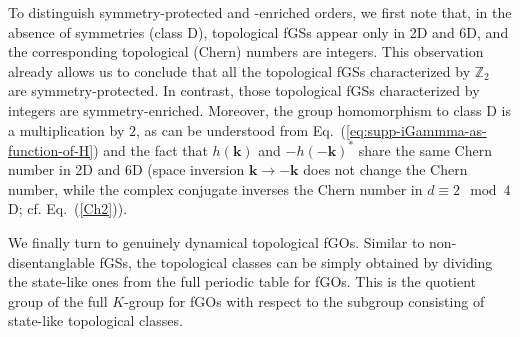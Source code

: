 \documentclass[prl,twocolumn,preprintnumbers,superscriptaddress,amsmath,amssymb]{revtex4-1}
\begin{document}
To distinguish symmetry-protected and -enriched orders, we first note that, in the absence of symmetries (class D), topological fGSs appear only in 2D and 6D, and the corresponding topological (Chern) numbers are integers. This observation already allows us to conclude that all the topological fGSs characterized by $\mathbb{Z}_2$ are symmetry-protected. In contrast, those topological fGSs characterized by integers are symmetry-enriched. Moreover, the group homomorphism to class D is a multiplication by $2$, as can be understood from Eq.~(\ref{eq:supp-iGammma-as-function-of-H}) and the fact that $h(\boldsymbol{k})$ and $-h(-\boldsymbol{k})^*$ share the same Chern number in 2D and 6D (space inversion $\boldsymbol{k}\to -\boldsymbol{k}$ does not change the Chern number, while the complex conjugate inverses the Chern number in $d\equiv 2\mod 4$D; cf. Eq.~(\ref{Ch2})).


We finally turn to genuinely dynamical topological fGOs. Similar to non-disentanglable fGSs, the topological classes can be simply obtained by dividing the state-like ones from the full periodic table for fGOs. This is the quotient group of the full $K$-group for fGOs with respect to the subgroup consisting of state-like topological classes.
\end{document}

